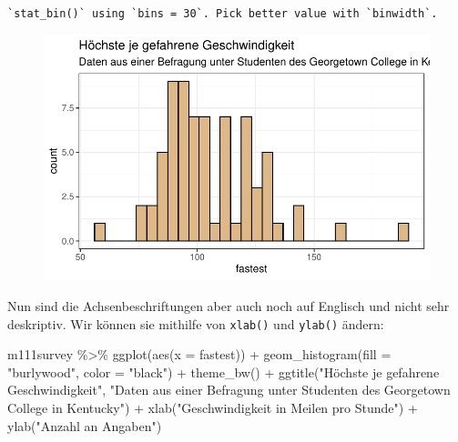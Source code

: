 \documentclass[
  letterpaper,
  DIV=11,
  numbers=noendperiod]{scrartcl}
\newenvironment{Shaded}{\begin{snugshade}}{\end{snugshade}}
\newcommand{\AttributeTok}[1]{\textcolor[rgb]{0.40,0.45,0.13}{#1}}
\newcommand{\FunctionTok}[1]{\textcolor[rgb]{0.28,0.35,0.67}{#1}}
\newcommand{\NormalTok}[1]{\textcolor[rgb]{0.00,0.23,0.31}{#1}}
\newcommand{\SpecialCharTok}[1]{\textcolor[rgb]{0.37,0.37,0.37}{#1}}
\newcommand{\StringTok}[1]{\textcolor[rgb]{0.13,0.47,0.30}{#1}}
\begin{document}
\begin{verbatim}
`stat_bin()` using `bins = 30`. Pick better value with `binwidth`.
\end{verbatim}

\begin{figure}[H]

{\centering \includegraphics{05-visualisierung_files/figure-pdf/unnamed-chunk-11-1.pdf}

}

\end{figure}

Nun sind die Achsenbeschriftungen aber auch noch auf Englisch und nicht
sehr deskriptiv. Wir können sie mithilfe von \texttt{xlab()} und
\texttt{ylab()} ändern:

\begin{Shaded}
\begin{Highlighting}[]
\NormalTok{m111survey }\SpecialCharTok{\%\textgreater{}\%} 
  \FunctionTok{ggplot}\NormalTok{(}\FunctionTok{aes}\NormalTok{(}\AttributeTok{x =}\NormalTok{ fastest)) }\SpecialCharTok{+}
  \FunctionTok{geom\_histogram}\NormalTok{(}\AttributeTok{fill =} \StringTok{"burlywood"}\NormalTok{, }\AttributeTok{color =} \StringTok{"black"}\NormalTok{) }\SpecialCharTok{+}
  \FunctionTok{theme\_bw}\NormalTok{() }\SpecialCharTok{+}
  \FunctionTok{ggtitle}\NormalTok{(}\StringTok{"Höchste je gefahrene Geschwindigkeit"}\NormalTok{,}
          \StringTok{"Daten aus einer Befragung unter Studenten des Georgetown College in Kentucky"}\NormalTok{) }\SpecialCharTok{+}
  \FunctionTok{xlab}\NormalTok{(}\StringTok{"Geschwindigkeit in Meilen pro Stunde"}\NormalTok{) }\SpecialCharTok{+}
  \FunctionTok{ylab}\NormalTok{(}\StringTok{"Anzahl an Angaben"}\NormalTok{)}
\end{Highlighting}
\end{Shaded}
\end{document}
